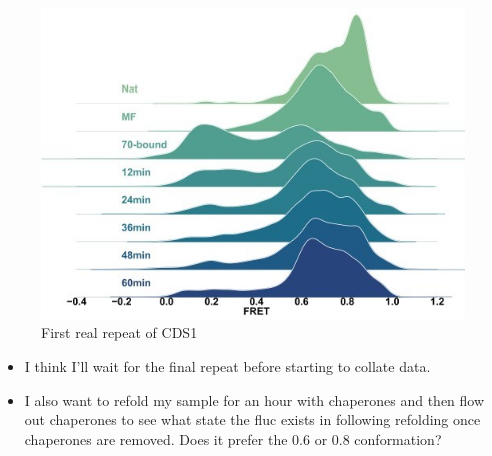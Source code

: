 \documentclass[
  letterpaper,
  DIV=11,
  numbers=noendperiod]{scrartcl}
\providecommand{\tightlist}{%
  \setlength{\itemsep}{0pt}\setlength{\parskip}{0pt}}\usepackage{longtable,booktabs,array}
\begin{document}
\begin{figure}

{\centering \includegraphics{Capture.PNG}

}

\caption{First real repeat of CDS1}

\end{figure}

\begin{itemize}
\tightlist
\item
  I think I'll wait for the final repeat before starting to collate
  data.
\item
  I also want to refold my sample for an hour with chaperones and then
  flow out chaperones to see what state the fluc exists in following
  refolding once chaperones are removed. Does it prefer the 0.6 or 0.8
  conformation?
\end{itemize}
\end{document}
